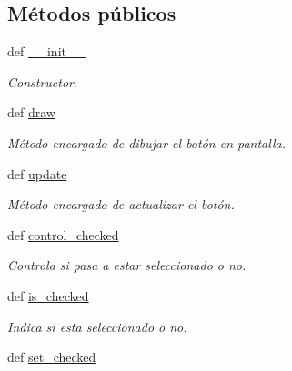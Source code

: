 \subsection*{\-Métodos públicos}
\begin{DoxyCompactItemize}
\item 
def \hyperlink{classengine_1_1checkbox_1_1CheckBox_a064bb39ee72f0e37173a615a7613a593}{\-\_\-\-\_\-init\-\_\-\-\_\-}
\begin{DoxyCompactList}\small\item\em \-Constructor. \end{DoxyCompactList}\item 
def \hyperlink{classengine_1_1checkbox_1_1CheckBox_a102794c22e26799db2a06e9a43baf9a4}{draw}
\begin{DoxyCompactList}\small\item\em \-Método encargado de dibujar el botón en pantalla. \end{DoxyCompactList}\item 
\hypertarget{classengine_1_1checkbox_1_1CheckBox_a7356f7c0dd2352db6443f3030ebd3805}{
def \hyperlink{classengine_1_1checkbox_1_1CheckBox_a7356f7c0dd2352db6443f3030ebd3805}{update}}
\label{classengine_1_1checkbox_1_1CheckBox_a7356f7c0dd2352db6443f3030ebd3805}

\begin{DoxyCompactList}\small\item\em \-Método encargado de actualizar el botón. \end{DoxyCompactList}\item 
\hypertarget{classengine_1_1checkbox_1_1CheckBox_a6fab6e4f58518657006687c5aa5c1669}{
def \hyperlink{classengine_1_1checkbox_1_1CheckBox_a6fab6e4f58518657006687c5aa5c1669}{control\-\_\-checked}}
\label{classengine_1_1checkbox_1_1CheckBox_a6fab6e4f58518657006687c5aa5c1669}

\begin{DoxyCompactList}\small\item\em \-Controla si pasa a estar seleccionado o no. \end{DoxyCompactList}\item 
def \hyperlink{classengine_1_1checkbox_1_1CheckBox_acaeb22ba015f0c165e11e909910da05d}{is\-\_\-checked}
\begin{DoxyCompactList}\small\item\em \-Indica si esta seleccionado o no. \end{DoxyCompactList}\item 
\hypertarget{classengine_1_1checkbox_1_1CheckBox_a42b4a38f4effd9e6ad7f1a2a1ca690b3}{
def \hyperlink{classengine_1_1checkbox_1_1CheckBox_a42b4a38f4effd9e6ad7f1a2a1ca690b3}{set\-\_\-checked}}
\label{classengine_1_1checkbox_1_1CheckBox_a42b4a38f4effd9e6ad7f1a2a1ca690b3}


\end{DoxyCompactItemize}
